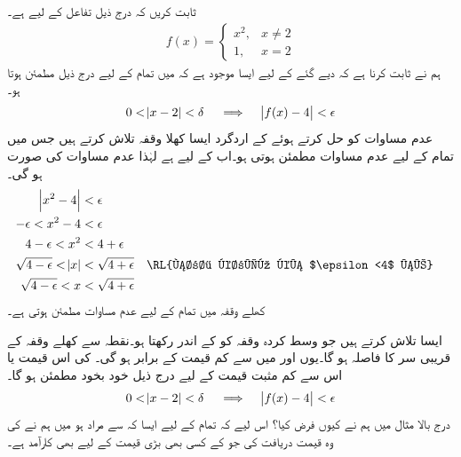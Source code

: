 ثابت کریں کہ درج ذیل تفاعل کے لیے  ہے۔
\begin{align*}
f(x)=\begin{cases}
x^2,&x\ne 2\\
1,&x=2
\end{cases}
\end{align*}
ہم نے ثابت کرنا ہے کہ دیے گئے  کے لیے ایسا  موجود ہے کہ  میں تمام  کے لیے درج ذیل مطمئن ہوتا ہو۔
\begin{align*}
0<\abs{x-2}<\delta\quad \implies \quad \abs{f(x)-4}<\epsilon
\end{align*}
\quad
عدم مساوات  کو حل کرتے ہوئے  کے اردگرد ایسا کھلا وقفہ تلاش کرتے ہیں جس میں تمام  کے لیے عدم مساوات مطمئن ہوتی ہو۔اب  کے لیے  ہے لہٰذا عدم مساوات کی صورت  ہو گی۔ 
\begin{align*}
\abs{x^2-4}&<\epsilon\\
-\epsilon<x^2-4&<\epsilon\\
4-\epsilon<x^2&<4+\epsilon\\
\sqrt{4-\epsilon}<\abs{x}&<\sqrt{4+\epsilon}&&\text{\RL{فرض کریں کہ $\epsilon<4$ ہے}}\\
\sqrt{4-\epsilon}<x&<\sqrt{4+\epsilon}
\end{align*}
کھلے وقفہ  میں تمام  کے لیے عدم مساوات  مطمئن ہوتی ہے۔

\quad
ایسا  تلاش کرتے ہیں جو وسط کردہ وقفہ  کو  کے اندر رکھتا ہو۔نقطہ  سے کھلے  وقفہ  کے قریبی سر کا فاصلہ  ہو گا۔یوں  اور   میں سے کم قیمت  کے برابر ہو گی۔ کی اس قیمت یا اس سے  کم مثبت قیمت کے لیے درج ذیل خود بخود مطمئن ہو گا۔
\begin{align*}
0<\abs{x-2}<\delta\quad \implies \quad \abs{f(x)-4}<\epsilon
\end{align*} 
درج بالا مثال میں ہم نے  کیوں فرض کیا؟ اس لیے کہ تمام  کے لیے ایسا  کہ  سے مراد  ہو میں ہم نے  کی وہ قیمت دریافت کی جو  کے کسی بھی  بڑی قیمت کے لیے بھی کارآمد ہے۔

